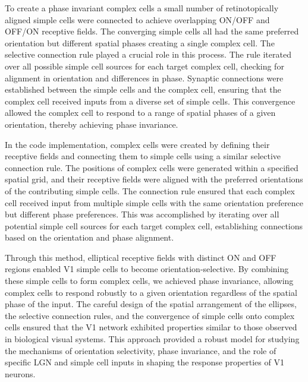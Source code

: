 \documentclass[12pt]{article}
\begin{document}
To create a phase invariant complex cells a small number of retinotopically aligned simple cells were connected to achieve overlapping ON/OFF and OFF/ON receptive fields. The converging simple cells all had the same preferred orientation but different spatial phases creating a single complex cell. The selective connection rule played a crucial role in this process. The rule iterated over all possible simple cell sources for each target complex cell, checking for alignment in orientation and differences in phase. Synaptic connections were established between the simple cells and the complex cell, ensuring that the complex cell received inputs from a diverse set of simple cells. This convergence allowed the complex cell to respond to a range of spatial phases of a given orientation, thereby achieving phase invariance.

In the code implementation, complex cells were created by defining their receptive fields and connecting them to simple cells using a similar selective connection rule. The positions of complex cells were generated within a specified spatial grid, and their receptive fields were aligned with the preferred orientations of the contributing simple cells. The connection rule ensured that each complex cell received input from multiple simple cells with the same orientation preference but different phase preferences. This was accomplished by iterating over all potential simple cell sources for each target complex cell, establishing connections based on the orientation and phase alignment.

Through this method, elliptical receptive fields with distinct ON and OFF regions enabled V1 simple cells to become orientation-selective. By combining these simple cells to form complex cells, we achieved phase invariance, allowing complex cells to respond robustly to a given orientation regardless of the spatial phase of the input. The careful design of the spatial arrangement of the ellipses, the selective connection rules, and the convergence of simple cells onto complex cells ensured that the V1 network exhibited properties similar to those observed in biological visual systems. This approach provided a robust model for studying the mechanisms of orientation selectivity, phase invariance, and the role of specific LGN and simple cell inputs in shaping the response properties of V1 neurons.
\end{document}
